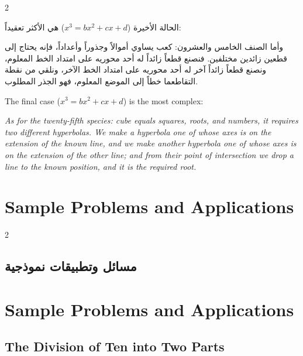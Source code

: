 \documentclass[11pt,a4paper]{book}
\begin{document}
\begin{paracol}{2}

\begin{Arabic}
الحالة الأخيرة ($x^3 = b x^2 + c x + d$) هي الأكثر تعقيداً:

وأما الصنف الخامس والعشرون: كعب يساوي أموالاً وجذوراً وأعداداً، فإنه يحتاج إلى قطعين زائدين مختلفين. فنصنع قطعاً زائداً له أحد محوريه على امتداد الخط المعلوم، ونصنع قطعاً زائداً آخر له أحد محوريه على امتداد الخط الآخر، ونلقي من نقطة التقاطعما خطاً إلى الموضع المعلوم، فهو الجذر المطلوب.
\end{Arabic}

\switchcolumn

The final case ($x^3 = b x^2 + c x + d$) is the most complex:

\textit{As for the twenty-fifth species: cube equals squares, roots, and numbers, it requires two different hyperbolas. We make a hyperbola one of whose axes is on the extension of the known line, and we make another hyperbola one of whose axes is on the extension of the other line; and from their point of intersection we drop a line to the known position, and it is the required root.}

\end{paracol}

\clearpage
\section{Sample Problems and Applications}
\label{sec:problems}

\begin{paracol}{2}

\begin{Arabic}
\section*{مسائل وتطبيقات نموذجية}
\end{Arabic}

\switchcolumn

\section*{Sample Problems and Applications}

\end{paracol}

\subsection{The Division of Ten into Two Parts}
\label{subsec:division-ten}
\end{document}
